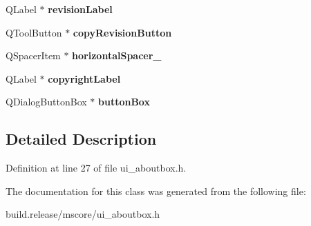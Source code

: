 \begin{DoxyCompactItemize}
\item 
\mbox{\label{class_ui___about_box_a4e9932cee1ff1ec9ba5bf8b5d92aca9b}} 
Q\+Label $\ast$ {\bfseries revision\+Label}
\item 
\mbox{\label{class_ui___about_box_a8ea76c43e3e83c2f4562ff66739a7be9}} 
Q\+Tool\+Button $\ast$ {\bfseries copy\+Revision\+Button}
\item 
\mbox{\label{class_ui___about_box_a1839b42173d086d9ed3ceecd0557c081}} 
Q\+Spacer\+Item $\ast$ {\bfseries horizontal\+Spacer\+\_}
\item 
\mbox{\label{class_ui___about_box_a82e3a0f15c2cb2cdf246bad62abba00f}} 
Q\+Label $\ast$ {\bfseries copyright\+Label}
\item 
\mbox{\label{class_ui___about_box_a89bda80f335cbed37fceb8ad113d64fd}} 
Q\+Dialog\+Button\+Box $\ast$ {\bfseries button\+Box}
\end{DoxyCompactItemize}


\subsection{Detailed Description}


Definition at line 27 of file ui\+\_\+aboutbox.\+h.



The documentation for this class was generated from the following file\+:\begin{DoxyCompactItemize}
\item 
build.\+release/mscore/ui\+\_\+aboutbox.\+h\end{DoxyCompactItemize}
